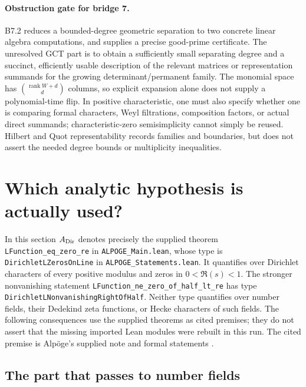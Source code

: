 \documentclass[11pt,a4paper]{article}
\begin{document}
\paragraph{Obstruction gate for bridge 7.}
B7.2 reduces a bounded-degree geometric separation to two concrete
linear algebra computations, and supplies a precise good-prime
certificate.  The unresolved GCT part is to obtain a sufficiently
small separating degree and a succinct, efficiently usable description
of the relevant matrices or representation summands for the growing
determinant/permanent family.  The monomial space has
$\binom{\operatorname{rank}W+d}{d}$ columns, so explicit expansion
alone does not supply a polynomial-time flip.  In positive
characteristic, one must also specify whether one is comparing formal
characters, Weyl filtrations, composition factors, or actual direct
summands; characteristic-zero semisimplicity cannot simply be reused.
Hilbert and Quot representability records families and boundaries, but
does not assert the needed degree bounds or multiplicity inequalities.


\section{Which analytic hypothesis is actually used?}
\label{sec:complexity-grh}

In this section \(A_{\rm Dir}\) denotes precisely the supplied theorem
\texttt{LFunction\_eq\_zero\_re} in \texttt{ALPOGE\_Main.lean}, whose type is
\texttt{DirichletLZerosOnLine} in \texttt{ALPOGE\_Statements.lean}.
It quantifies over Dirichlet characters of every positive modulus and zeros in
\(0<\Re(s)<1\).  The stronger nonvanishing statement
\texttt{LFunction\_ne\_zero\_of\_half\_lt\_re} has type
\texttt{DirichletLNonvanishingRightOfHalf}.  Neither type quantifies over number
fields, their Dedekind zeta functions, or Hecke characters of such fields.
The following consequences use the supplied theorems as cited premises; they
do not assert that the missing imported Lean modules were rebuilt in this run.
The cited premise is Alp\"oge's supplied note and formal statements
\cite{CAlpoge26}.

\subsection{The part that passes to number fields}
\end{document}
